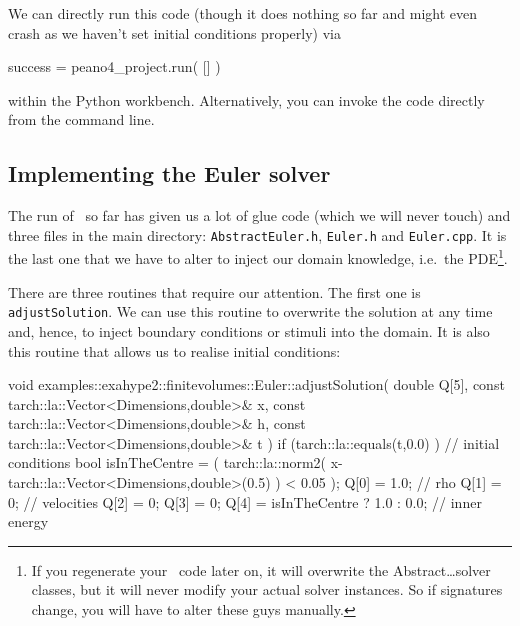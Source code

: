 \noindent
We can directly run this code (though it does nothing so far and might even
crash as we haven't set initial conditions properly) via
\begin{code}
success = peano4_project.run( [] )
\end{code}
within the Python workbench. 
Alternatively, you can invoke the code directly from the command line. 



\subsection{Implementing the Euler solver}

The run of \ExaHyPE\ so far has given us a lot of glue code (which we will
never touch) and three files in the main directory:
\texttt{AbstractEuler.h}, \texttt{Euler.h} and \texttt{Euler.cpp}.
It is the last one that we have to alter to inject our domain knowledge,
i.e.~the PDE\footnote{If you regenerate your \ExaHyPE\ code later on, it will
overwrite the Abstract\ldots solver classes, but it will never modify your
actual solver instances. So if signatures change, you will have to alter these
guys manually.}.


There are three routines that require our attention.
The first one is \texttt{adjustSolution}.
We can use this routine to overwrite the solution at any time and, hence, to
inject boundary conditions or stimuli into the domain.
It is also this routine that allows us to realise initial conditions:
\begin{code}
void examples::exahype2::finitevolumes::Euler::adjustSolution(
  double Q[5],
  const tarch::la::Vector<Dimensions,double>&  x,
  const tarch::la::Vector<Dimensions,double>&  h,
  const tarch::la::Vector<Dimensions,double>&  t
) {
  if (tarch::la::equals(t,0.0) ) {
    // initial conditions
    bool isInTheCentre = ( tarch::la::norm2( x-tarch::la::Vector<Dimensions,double>(0.5) ) < 0.05 );
    Q[0] = 1.0;  // rho
    Q[1] = 0;    // velocities
    Q[2] = 0;
    Q[3] = 0;
    Q[4] = isInTheCentre ? 1.0 : 0.0; // inner energy
  }
}
\end{code}


